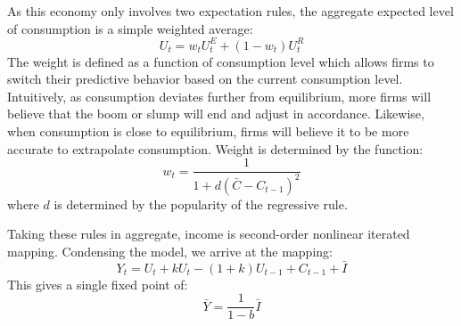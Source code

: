 As this economy only involves two expectation rules, the aggregate expected level of consumption is a simple weighted average:
\begin{equation}
    U_t=w_tU_t^E+(1-w_t)U_t^R
\end{equation}
The weight is defined as a function of consumption level which allows firms to switch their predictive behavior based on the current consumption level. Intuitively, as consumption deviates further from equilibrium, more firms will believe that the boom or slump will end and adjust in accordance. Likewise, when consumption is close to equilibrium, firms will believe it to be more accurate to extrapolate consumption. Weight is determined by the function:
\begin{equation}
    w_t=\frac{1}{1+d(\bar C-C_{t-1})^2}
\end{equation}
where $d$ is determined by the popularity of the regressive rule. 

Taking these rules in aggregate, income is second-order nonlinear iterated mapping. Condensing the model, we arrive at the mapping:
\begin{equation}
    Y_t=U_t+kU_t-(1+k)U_{t-1}+C_{t-1}+\bar I
\end{equation}
This gives a single fixed point of:
\begin{equation}
    \bar Y=\frac{1}{1-b}\bar I
\end{equation}
